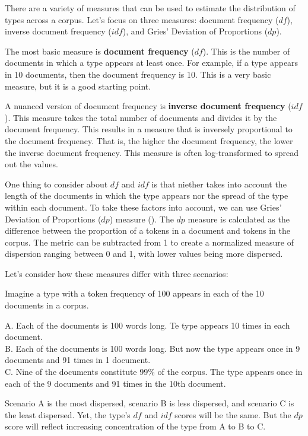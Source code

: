 \documentclass[
  letterpaper,
  DIV=11,
  numbers=noendperiod]{scrreprt}
\theoremstyle{definition}
\theoremstyle{remark}
\begin{document}
There are a variety of measures that can be used to estimate the
distribution of types across a corpus. Let's focus on three measures:
document frequency (\(df\)), inverse document frequency (\(idf\)), and
Gries' Deviation of Proportions (\(dp\)).

The most basic measure is \textbf{document frequency} (\(df\)). This is
the number of documents in which a type appears at least once. For
example, if a type appears in 10 documents, then the document frequency
is 10. This is a very basic measure, but it is a good starting point.

A nuanced version of document frequency is \textbf{inverse document
frequency} (\(idf\)). This measure takes the total number of documents
and divides it by the document frequency. This results in a measure that
is inversely proportional to the document frequency. That is, the higher
the document frequency, the lower the inverse document frequency. This
measure is often log-transformed to spread out the values.

One thing to consider about \(df\) and \(idf\) is that niether takes
into account the length of the documents in which the type appears nor
the spread of the type within each document. To take these factors into
account, we can use Gries' Deviation of Proportions (\(dp\)) measure
(). The \(dp\) measure
is calculated as the difference between the proportion of a tokens in a
document and tokens in the corpus. The metric can be subtracted from 1
to create a normalized measure of dispersion ranging between 0 and 1,
with lower values being more dispersed.

Let's consider how these measures differ with three scenarios:

Imagine a type with a token frequency of 100 appears in each of the 10
documents in a corpus.

A. Each of the documents is 100 words long. Te type appears 10 times in
each document.\\
B. Each of the documents is 100 words long. But now the type appears
once in 9 documents and 91 times in 1 document.\\
C. Nine of the documents constitute 99\% of the corpus. The type appears
once in each of the 9 documents and 91 times in the 10th document.

Scenario A is the most dispersed, scenario B is less dispersed, and
scenario C is the least dispersed. Yet, the type's \(df\) and \(idf\)
scores will be the same. But the \(dp\) score will reflect increasing
concentration of the type from A to B to C.
\end{document}
